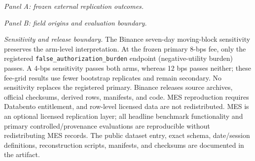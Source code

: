 \begin{table}[h]
  \caption{\textbf{The external intersection-union claim fails, and observed market data do not make weak priors or authority roles observational.} Panel A reports Cost-Aware Gate minus Lifecycle Checklist. Binance is confirmatory; MES is licensed descriptive evidence, and its fixed six-prior laundering contrast is structural. Panel B separates observed, pre-decision derived, benchmark-assigned, and sealed outcome-only fields.}
  \label{tab:external_orderbook}
  \label{tab:external_field_origins}
  \centering
  \benchmarktableformat
  \textit{Panel A: frozen external replication outcomes.}\par\smallskip
  
  \par\medskip
  \textit{Panel B: field origins and evaluation boundary.}\par\smallskip
  
  \par\medskip
  \begin{minipage}{0.96\textwidth}
  \small
  \textit{Sensitivity and release boundary.}
  The Binance seven-day moving-block sensitivity preserves the arm-level
  interpretation. At the frozen primary 8-bps fee, only the registered
  \texttt{false\_authorization\_burden} endpoint (negative-utility burden)
  passes. A 4-bps sensitivity passes both arms, whereas 12 bps passes
  neither; these fee-grid results use fewer bootstrap replicates and remain
  secondary. No sensitivity replaces the registered primary. Binance releases
  source archives, official checksums, derived rows, manifests, and code. MES
  reproduction requires Databento entitlement, and row-level licensed data are
  not redistributed. MES is an optional licensed replication layer; all
  headline benchmark functionality and primary controlled/provenance
  evaluations are reproducible without redistributing MES records. The public
  dataset entry, exact schema, date/session definitions, reconstruction scripts,
  manifests, and checksums are documented in the artifact.
  \end{minipage}
\end{table}

\FloatBarrier

